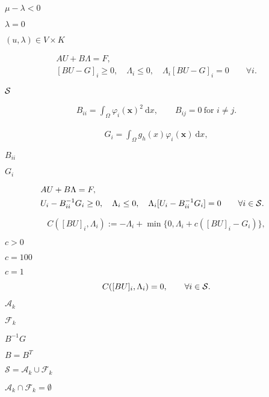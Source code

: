 \documentclass{article}
\begin{document}
$\mu-\lambda<0$
\pagebreak

$\lambda=0$
\pagebreak

$(u,\lambda)\in V\times K$
\pagebreak

\begin{eqnarray*} &A U + B\Lambda = F,&\\ &[BU-G]_i \geq 0, \quad \Lambda_i \leq 0,\quad \Lambda_i[BU-G]_i = 0 \qquad \forall i.& \end{eqnarray*}
\pagebreak

$\cal S$
\pagebreak

\begin{align*} B_{ii} = \int_\Omega \varphi_i(\mathbf x)^2\ \textrm{d}x, \qquad B_{ij}=0 \ \text{for } i\neq j. \end{align*}
\pagebreak

\begin{align*} G_{i} = \int_\Omega g_h(x) \varphi_i(\mathbf x)\ \textrm{d}x, \end{align*}
\pagebreak

$B_{ii}$
\pagebreak

$G_i$
\pagebreak

\begin{eqnarray*} &A U + B\Lambda = F,&\\ &U_i-B_{ii}^{-1}G_i \ge 0, \quad \Lambda_i \leq 0,\quad \Lambda_i[U_i-B_{ii}^{-1}G_i] = 0 \qquad \forall i\in{\cal S}.& \end{eqnarray*}
\pagebreak

\begin{equation*} C([BU]_i,\Lambda_i):=-\Lambda_i + \min\lbrace 0, \Lambda_i + c([BU]_i - G_i) \rbrace, \end{equation*}
\pagebreak

$c>0$
\pagebreak

$c = 100$
\pagebreak

$c = 1$
\pagebreak

\begin{equation*} C([BU]_i,\Lambda_i) = 0, \qquad \forall i\in{\cal S}. \end{equation*}
\pagebreak

$\mathcal{A}_k$
\pagebreak

$\mathcal{F}_k$
\pagebreak

$B^{-1}G$
\pagebreak

$B = B^T$
\pagebreak

$\mathcal{S}=\mathcal{A}_k\cup\mathcal{F}_k$
\pagebreak

$\mathcal{A}_k\cap\mathcal{F}_k=\emptyset$
\pagebreak
\end{document}
